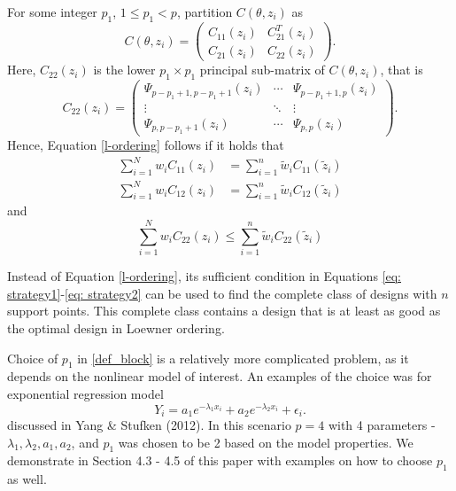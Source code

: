 \documentclass[12pt]{TD-CJS}
\begin{document}
For some integer $p_1$, $1\le p_1<p$, partition $C(\theta,z_i)$ as \begin{equation}\label{def_block}
    C(\theta,z_i) = \left(\begin{array}{cc}
      C_{11}(z_i)   &  C_{21}^T(z_i) \\
        C_{21}(z_i)  & C_{22}(z_i) 
    \end{array}\right).
\end{equation} Here, $C_{22}(z_i)$ is the lower $p_1\times p_1$ principal sub-matrix of $C(\theta,z_i)$, that is 
\begin{equation}\label{def_c22}
    C_{22}(z_i) = \left( \begin{array}{ccc}
      \Psi_{p-p_1+1, p-p_1+1}(z_i)   & \cdots & \Psi_{p-p_1+1, p}(z_i) \\
      \vdots & \ddots & \vdots\\
        \Psi_{p, p-p_1+1}(z_i)   &\cdots  & \Psi_{p, p}(z_i)  
    \end{array}\right).
\end{equation} Hence, Equation \eqref{l-ordering} follows if it holds that 
\begin{align}\label{eq: strategy1}
    \sum_{i=1}^Nw_iC_{11}(z_i) &= \sum_{i=1}^n \tilde{w}_iC_{11}(\tilde{z}_i)\\
    \sum_{i=1}^Nw_iC_{12}(z_i) &= \sum_{i=1}^n \tilde{w}_iC_{12}(\tilde{z}_i)
\end{align} and 
\begin{equation}\label{eq: strategy2}
    \sum_{i=1}^Nw_iC_{22}(z_i) \le \sum_{i=1}^n \tilde{w}_iC_{22}(\tilde{z}_i)
\end{equation}


Instead of Equation \eqref{l-ordering}, its sufficient condition in Equations \eqref{eq: strategy1}-\eqref{eq: strategy2} can be used to find the complete class of designs with $n$ support points. This complete class contains a design that is at least as good as the optimal design in Loewner ordering. \\

{\color{blue} Choice of $p_1$ in \eqref{def_block} is a relatively more complicated problem, as it depends on the nonlinear model of interest. An examples of the choice was for exponential regression model \[Y_i = a_1e^{-\lambda_1x_i} + a_2e^{-\lambda_2x_i} + \epsilon_i.\] discussed in Yang \& Stufken (2012).
In this scenario $p=4$ with 4 parameters - $\lambda_1, \lambda_2, a_1, a_2$, and  $p_1$ was chosen to be 2 based on the model properties. We demonstrate in Section 4.3 - 4.5 of this paper with examples on how to choose $p_1$ as well.

}
\end{document}
